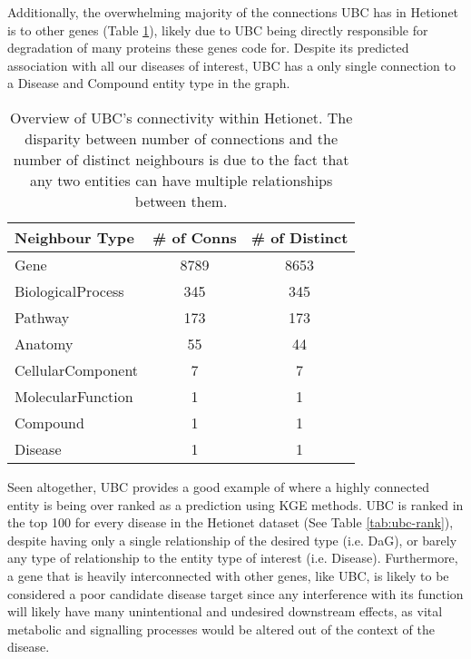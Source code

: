 Additionally, the overwhelming majority of the connections UBC has in Hetionet is to other genes (Table \ref{tab:ubc-conn}), likely due to UBC being directly responsible for degradation of many proteins these genes code for. Despite its predicted association with all our diseases of interest, UBC has a only single connection to a Disease and Compound entity type in the graph.

\begin{table}[ht!]
	\centering
	\begin{tabular}{l c c}
		\toprule
		\textbf{Neighbour Type} & \textbf{\# of Conns} & \textbf{\# of Distinct} \\ \midrule \midrule
		Gene                    & 8789                 & 8653                    \\
		BiologicalProcess       & 345                  & 345                     \\
		Pathway                 & 173                  & 173                     \\
		Anatomy                 & 55                   & 44                      \\
		CellularComponent       & 7                    & 7                       \\
		MolecularFunction       & 1                    & 1                       \\
		Compound                & 1                    & 1                       \\
		Disease                 & 1                    & 1                       \\ \bottomrule
	\end{tabular}
	\vspace{5pt}
	\caption{Overview of UBC's connectivity within Hetionet. The disparity between number of connections and the number of distinct neighbours is due to the fact that any two entities can have multiple relationships between them.}
	\label{tab:ubc-conn}
\end{table}

Seen altogether, UBC provides a good example of where a highly connected entity is being over ranked as a prediction using KGE methods. UBC is ranked in the top 100 for every disease in the Hetionet dataset (See Table \ref{tab:ubc-rank}), despite having only a single relationship of the desired type (i.e. DaG), or barely any type of relationship to the entity type of interest (i.e. Disease). Furthermore, a gene that is heavily interconnected with other genes, like UBC, is likely to be considered a poor candidate disease target since any interference with its function will likely have many unintentional and undesired downstream effects, as vital metabolic and signalling processes would be altered out of the context of the disease.


